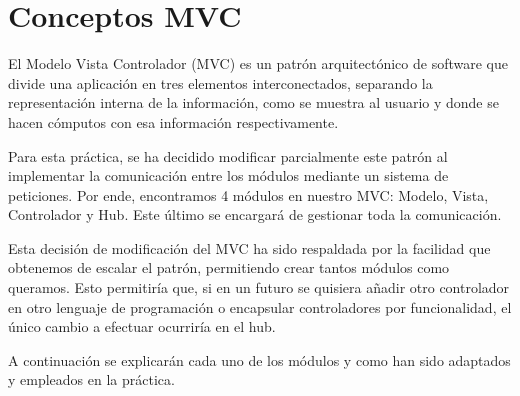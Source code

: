\section{Conceptos MVC}

El Modelo Vista Controlador (MVC) es un patrón arquitectónico de software que divide una aplicación en tres elementos interconectados, separando la representación interna de la información, como se muestra al usuario y donde se hacen cómputos con esa información respectivamente. \bigskip

Para esta práctica, se ha decidido modificar parcialmente este patrón al implementar la comunicación entre los módulos mediante un sistema de peticiones. Por ende, encontramos 4 módulos en nuestro MVC: Modelo, Vista, Controlador y Hub. Este último se encargará de gestionar toda la comunicación. \bigskip

Esta decisión de modificación del MVC ha sido respaldada por la facilidad que obtenemos de escalar el patrón, permitiendo crear tantos módulos como queramos. Esto permitiría que, si en un futuro se quisiera añadir otro controlador en otro lenguaje de programación o encapsular controladores por funcionalidad, el único cambio a efectuar ocurriría en el hub.\bigskip


A continuación se explicarán cada uno de los módulos y como han sido adaptados y empleados en la práctica.







